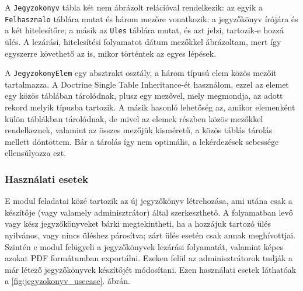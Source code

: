 \documentclass[a4paper,12pt,oneside]{report}
\begin{document}
A {\tt Jegyzokonyv} tábla két nem ábrázolt relációval rendelkezik: az egyik a {\tt Felhasznalo} táblára mutat és három mezőre vonatkozik: a jegyzőkönyv írójára és a két hitelesítőre; a másik az {\tt Ules} táblára mutat, és azt jelzi, tartozik-e hozzá ülés. A lezárási, hitelesítési folyamatot dátum mezőkkel ábrázoltam, mert így egyszerre követhető az is, mikor történtek az egyes lépések.

A {\tt JegyzokonyElem} egy absztrakt osztály, a három típusú elem közös mezőit tartalmazza. A Doctrine Single Table Inheritance-ét használom, ezzel az elemet egy közös táblában tárolódnak, plusz egy mezővel, mely megmondja, az adott rekord melyik típusba tartozik. A másik hasonló lehetőség az, amikor elemenként külön táblákban tárolódnak, de mivel az elemek részben közös mezőkkel rendelkeznek, valamint az összes mezőjük kisméretű, a közös táblás tárolás mellett döntöttem. Bár a tárolás így nem optimális, a lekérdezések sebessége ellensúlyozza ezt.

\subsubsection*{Használati esetek}

E modul feladatai közé tartozik az új jegyzőkönyv létrehozása, ami utána csak a készítője (vagy valamely adminisztrátor) által szerkeszthető. A folyamatban levő vagy kész jegyzőkönyveket bárki megtekintheti, ha a hozzájuk tartozó ülés nyilvános, vagy nincs üléshez párosítva; zárt ülés esetén csak annak meghívottjai. Szintén e modul felügyeli a jegyzőkönyvek lezárási folyamatát, valamint képes azokat PDF formátumban exportálni. Ezeken felül az adminisztrátorok tudják a már létező jegyzőkönyvek készítőjét módosítani. Ezen használati esetek láthatóak a \ref{fig:jegyzokonyv_usecase}. ábrán.
\end{document}
